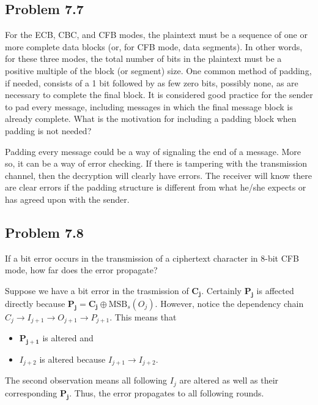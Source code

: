 \documentclass[../hw_sols.tex]{subfiles}
\begin{document}

\subsection*{Problem 7.7}

For the ECB, CBC, and CFB modes, the plaintext must be a sequence of one or 
more complete data blocks (or, for CFB mode, data segments). In other words, 
for these three modes, the total number of bits in the plaintext must be a 
positive multiple of the block (or segment) size. One common method of 
padding, if needed, consists of a 1 bit followed by as few zero bits, 
possibly none, as are necessary to complete the final block. It is considered 
good practice for the sender to pad every message, including messages in 
which the final message block is already complete. What is the motivation for 
including a padding block when padding is not needed?

\begin{solution}
Padding every message could be a way of signaling the end of a message. More 
so, it can be a way of error checking. If there is tampering with the 
transmission channel, then the decryption will clearly have errors. The 
receiver will know there are clear errors if the padding structure is 
different from what he/she expects or has agreed upon with the sender.
\end{solution}


\newpage



\subsection*{Problem 7.8}

If a bit error occurs in the transmission of a ciphertext character in 8-bit 
CFB mode, how far does the error propagate?

\begin{solution}
Suppose we have a bit error in the trasmission of $\mathbf{C_j}$. Certainly 
$\mathbf{P_j}$ is affected directly because 
$\mathbf{P_j} = \mathbf{C_j} \oplus \text{MSB}_s(O_j)$. However, notice 
the dependency chain $C_j \to I_{j+1} \to O_{j+1} \to P_{j+1}$. This means 
that 
\begin{itemize}
	\item $\mathbf{P_{j+1}}$ is altered and
	\item $I_{j+2}$ is altered because $I_{j+1} \to I_{j+2}$.
\end{itemize}

The second observation means all following $I_j$ are altered as well as their 
corresponding $\mathbf{P_j}$. Thus, the error propagates to all following 
rounds.
\end{solution}
\end{document}

